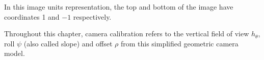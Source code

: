 
%
%
In this image units representation, the top and bottom of the image have coordinates 1 and $-1$ respectively. 

Throughout this chapter, camera calibration refers to the vertical field of view $h_{\theta}$, roll $\psi$ (also called slope) and offset $\rho$ from this simplified geometric camera model.
